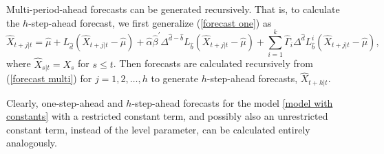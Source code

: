 \documentclass[article]{jss}
\newcommand{\fct}[1]{\code{#1()}}
\begin{document}
Multi-period-ahead forecasts can be generated recursively. That is, to calculate the $h$-step-ahead forecast, we first generalize (\ref{forecast one}) as
\begin{equation}
\hat{X}_{t+j|t}=\hat{\mu}+L_{\hat{d}} (\hat{X}_{t+j|t}-\hat{\mu})+\hat{\alpha}\hat{\beta}^{\prime}
\Delta^{\hat{d}-\hat{b}}L_{\hat{b}}(\hat{X}_{t+j|t}-\hat{\mu})+\sum_{i=1}^{k}
\hat{\Gamma}_{i}\Delta^{\hat{d}} L_{\hat{b}}^{i}(\hat{X}_{t+j|t}-\hat{\mu}),
\label{forecast multi}
\end{equation}
where $\hat{X}_{s|t}=X_{s}$ for $s\leq t$. Then forecasts are calculated recursively from (\ref{forecast multi}) for $j=1,2,\ldots,h$ to generate $h$-step-ahead forecasts, $\hat{X}_{t+h|t}$.

Clearly, one-step-ahead and $h$-step-ahead forecasts for the model \eqref{model with constants} with a restricted constant term, and possibly also an unrestricted constant term, instead of the level parameter, can be calculated entirely analogously.





\end{document}
